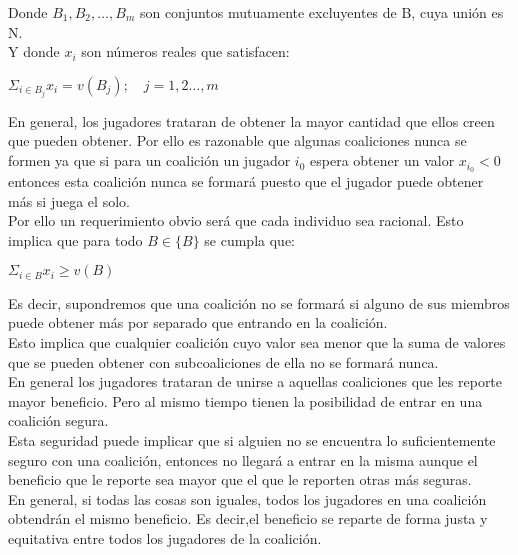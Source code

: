 \documentclass[10pt,a4paper]{book}
\begin{document}
Donde $B_1,B_2,\ldots ,B_m$ son conjuntos mutuamente excluyentes de B, cuya unión es N.\\
Y donde $x_i$ son números reales que satisfacen:\\

\begin{center}

$\Sigma_{i \in B_j} x_i= v(B_j); \quad j=1,2 \ldots ,m$

\end{center}

En general, los jugadores trataran de obtener la mayor cantidad que ellos creen que pueden obtener. Por ello es razonable que algunas coaliciones nunca se formen ya que si para un coalición un jugador $i_0$ espera obtener un valor $x_{i_0} <0 $ entonces esta coalición nunca se formará puesto que el jugador puede obtener más si juega el solo.\\

Por ello un requerimiento obvio será que cada individuo sea racional. Esto implica que para todo $ B \in \{B\}$ se cumpla que:\\

\begin{center}

$ \Sigma_{i \in B} x_i \geq v(B)$

\end{center}

Es decir, supondremos que una coalición no se formará si alguno de sus miembros puede obtener más por separado que entrando en la coalición.\\

Esto implica que cualquier coalición cuyo valor sea menor que la suma de valores que se pueden obtener con subcoaliciones de ella no se formará nunca.\\

En general los jugadores trataran de unirse a aquellas coaliciones que les reporte mayor beneficio. Pero al mismo tiempo tienen la posibilidad de entrar en una coalición segura.\\

Esta seguridad puede implicar que si alguien no se encuentra lo suficientemente seguro con una coalición, entonces no llegará a entrar en la misma aunque el beneficio que le reporte sea mayor que el que le reporten otras más seguras.\\

En general, si todas las cosas son iguales, todos los jugadores en una coalición obtendrán el mismo beneficio. Es decir,el beneficio se reparte de forma justa y equitativa entre todos los jugadores de la coalición.\\
\end{document}
